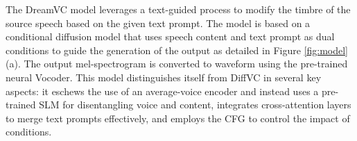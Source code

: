 \documentclass{Interspeech2024}
\begin{document}
The DreamVC model leverages a text-guided process to modify the timbre of the source speech based on the given text prompt. The model is based on a conditional diffusion model that uses speech content 
and text prompt 
as dual conditions to guide the generation of the output as detailed in Figure \ref{fig:model}(a). The output mel-spectrogram is converted to waveform using the pre-trained neural Vocoder. This model distinguishes itself from DiffVC \cite{popov2021diffusion} in several key aspects: it eschews the use of an average-voice encoder and instead uses a pre-trained SLM for disentangling voice and content, integrates cross-attention layers to merge text prompts effectively, and employs the CFG to control the impact of conditions.



\end{document}
